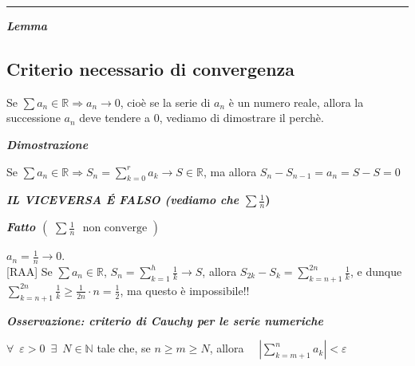 \documentclass{article}
\theoremstyle{definition}
\newcommand{\R}{\mathbb{R}}
\newcommand{\N}{\mathbb{N}}
\begin{document}
\vspace{15pt}
\hrule
\vspace{15pt}

\begin{center}
    \textbf{\textit{Lemma}}
\end{center}
\subsection{Criterio necessario di convergenza}
Se $\sum a_n \in \R \Longrightarrow a_n \to 0$, cioè se la serie di $a_n$ è un numero reale, allora la successione $a_n$ deve tendere a 0, vediamo di dimostrare il perchè.
\\
\begin{center}
    \textbf{\textit{Dimostrazione}}
\end{center}
Se $\sum a_n \in \R \Longrightarrow S_n=\sum_{k=0}^r a_k \to S \in \R$, ma allora $S_n-S_{n-1}=a_n=S-S=0$
\begin{center}
    \textbf{\textit{ IL VICEVERSA \'E FALSO (vediamo che $\sum \frac{1}{n}$})}
\end{center}
\newpage
\begin{center}
    \textbf{\textit{Fatto $\left(\,\,\sum \frac{1}{n} \,\,\,\,\mbox{non converge}\,\,\right)$}}
\end{center}
$a_n=\frac{1}{n} \to 0$. \\
{[RAA]} Se $\sum a_n \in \R$, $S_n=\sum_{k=1}^h \frac{1}{k} \to S$, allora $S_{2k}-S_{k}=\sum_{k=n+1}^{2n} \frac{1}{k}$, e dunque $\sum_{k=n+1}^{2n} \frac{1}{k} \geqslant \frac{1}{2n} \cdot n=\frac{1}{2}$, ma questo è impossibile!!
\begin{center}
    \textbf{\textit{Osservazione: criterio di Cauchy per le serie numeriche}}
\end{center}
$\forall \,\,\, \varepsilon > 0 \,\,\, \exists \,\,\, N \in \N$ tale che, se $n \geqslant m \geqslant N$, allora \,\,\,\,\,\,$|\sum_{k=m+1}^n a_k|< \varepsilon $
\end{document}
